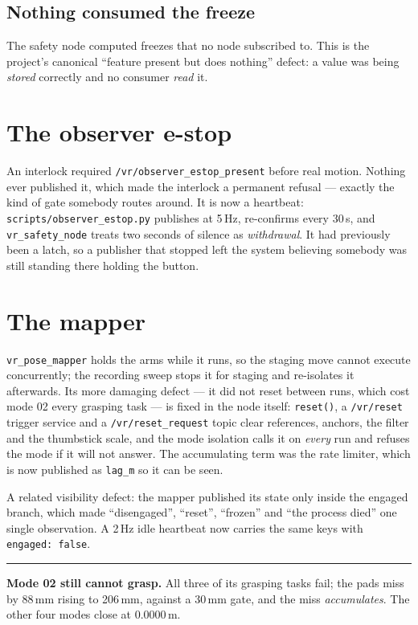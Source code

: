 \documentclass[11pt,a4paper,oneside]{report}
\newcommand{\code}[1]{\texttt{\small #1}}
\newcommand{\file}[1]{\texttt{\small #1}}
\newcommand{\keyfact}[1]{%
  \par\vspace{7pt}\noindent
  \hspace*{0pt}\textcolor{srlblue}{\rule{2.5pt}{\dimexpr\baselineskip\relax}}%
  \hspace{9pt}%
  \begin{minipage}[t]{\dimexpr\textwidth-14pt\relax}
  \small #1
  \end{minipage}\par\vspace{7pt}}
\begin{document}
\subsection{Nothing consumed the freeze}

The safety node computed freezes that no node subscribed to. This is the
project's canonical ``feature present but does nothing'' defect: a value was
being \emph{stored} correctly and no consumer \emph{read} it.

\section{The observer e-stop}

An interlock required \code{/vr/observer\_estop\_present} before real motion.
Nothing ever published it, which made the interlock a permanent refusal ---
exactly the kind of gate somebody routes around. It is now a heartbeat:
\file{scripts/observer\_estop.py} publishes at 5\,Hz, re-confirms every 30\,s,
and \code{vr\_safety\_node} treats two seconds of silence as \emph{withdrawal}.
It had previously been a latch, so a publisher that stopped left the system
believing somebody was still standing there holding the button.

\section{The mapper}

\code{vr\_pose\_mapper} holds the arms while it runs, so the staging move
cannot execute concurrently; the recording sweep stops it for staging and
re-isolates it afterwards. Its more damaging defect --- it did not reset
between runs, which cost mode 02 every grasping task --- is fixed in the node
itself: \code{reset()}, a \code{/vr/reset} trigger service and a
\code{/vr/reset\_request} topic clear references, anchors, the filter and the
thumbstick scale, and the mode isolation calls it on \emph{every} run and
refuses the mode if it will not answer. The accumulating term was the rate
limiter, which is now published as \code{lag\_m} so it can be seen.

A related visibility defect: the mapper published its state only inside the
engaged branch, which made ``disengaged'', ``reset'', ``frozen'' and ``the
process died'' one single observation. A 2\,Hz idle heartbeat now carries the
same keys with \code{engaged: false}.

\keyfact{\textbf{Mode 02 still cannot grasp.} All three of its grasping tasks
fail; the pads miss by 88\,mm rising to 206\,mm, against a 30\,mm gate, and the
miss \emph{accumulates}. The other four modes close at 0.0000\,m.}
\end{document}
